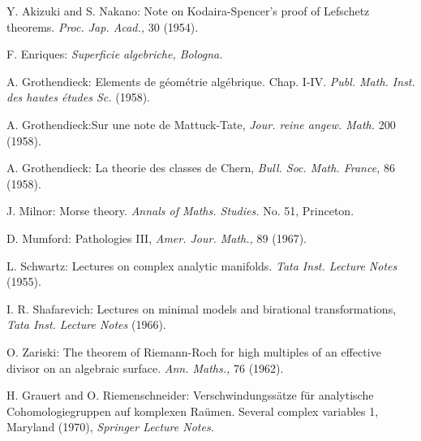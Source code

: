 \begin{thebibliography}{99}
 Y. Akizuki and S. Nakano: Note on
Kodaira-Spencer's proof of Lefschetz theorems. {\em Proc. Jap. Acad.,}
30 (1954).

 F. Enriques: {\em Superficie algebriche, Bologna.}

 A. Grothendieck: Elements de g\'eom\'etrie
alg\'ebrique. Chap. I-IV. {\em Publ. Math. Inst. des hautes \'etudes
Sc.} (1958).

 A. Grothendieck:\pageoriginale Sur une note de Mattuck-Tate,
{\em Jour. reine angew. Math.} 200 (1958).

 A. Grothendieck: La theorie des classes de Chern,
{\em Bull. Soc. Math. France,} 86 (1958).

 J. Milnor: Morse theory. {\em Annals of
Maths. Studies. } No. 51, Princeton.

 D. Mumford: Pathologies III, {\em
Amer. Jour. Math.,} 89 (1967).

 L. Schwartz: Lectures on complex analytic
manifolds. {\em Tata Inst. Lecture Notes } (1955).

 I. R. Shafarevich: Lectures on minimal models and
birational transformations, {\em Tata Inst. Lecture Notes} (1966).

 O. Zariski: The theorem of Riemann-Roch for high
multiples of an effective divisor on an algebraic surface. {\em
Ann. Maths.,} 76 (1962).   

 H. Grauert and O. Riemenschneider:
Verschwindungss\"atze f\"ur analytische Cohomologiegruppen auf
komplexen Ra\"umen. Several complex variables 1, Maryland (1970), {\em
Springer Lecture Notes.}

\end{thebibliography}
